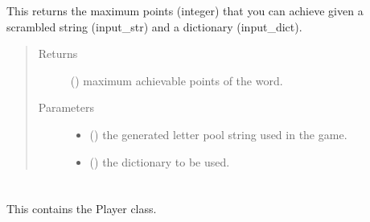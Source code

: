 \documentclass[letterpaper,10pt,english,openany,oneside]{sphinxmanual}
\begin{document}
\begin{fulllineitems}
\label{\detokenize{index:combine.max_points}}
This returns the maximum points (integer) that you can achieve
given a scrambled string (input\_str) and a dictionary (input\_dict).
\begin{quote}\begin{description}
\item[{Returns}] \leavevmode
() maximum achievable points of the word.

\item[{Parameters}] \leavevmode\begin{itemize}
\item {} 
 () \textendash{} the generated letter pool string used in the game.

\item {} 
 () \textendash{} the dictionary to be used.

\end{itemize}

\end{description}\end{quote}

\end{fulllineitems}



\section{}
\label{\detokenize{index:module-player}}\label{\detokenize{index:player-py}}
This contains the Player class.
\end{document}
